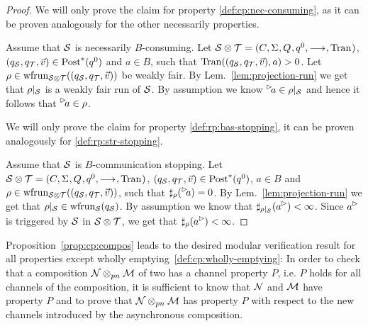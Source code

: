 \begin{proof}
    \smallskip{}
    We will only prove the claim for property \ref{def:cp:nec-consuming}, as it can be proven analogously for the other necessarily properties.

    Assume that $\S$ is necessarily $B$-consuming. Let $\S\compos\T = \aiotstup{}$, $(q_\S,q_\T,\vec{v}) \in \post^*(q^0)$ and $a \in B$, such that $\val((q_\S,q_\T,\vec{v}),a)>0$. Let \linebreak $\rho \in \frun{\S\compos\T}((q_\S,q_\T,\vec{v}))$ be weakly fair. 
 By Lem.~\ref{lem:projection-run} we get that $\rho|_\S$ is a weakly fair run of $\S$. By assumption we know $\inact{a} \in \rho|_\S$ and hence it follows that $\inact{a} \in \rho$.

    \smallskip{}
    We will only prove the claim for property \ref{def:rp:bas-stopping}, it can be proven analogously for \ref{def:rp:str-stopping}.

   Assume that $\S$ is $B$-communication stopping. Let $\S\compos\T = \aiotstup{}$, $(q_\S,q_\T,\vec{v}) \in \post^*(q^0)$, $a \in B$ and $\rho \in \frun{\S\compos\T}((q_\S,q_\T,\vec{v}))$, such that $\sharp_\rho(\inact{a}) = 0$. 
 By Lem.~\ref{lem:projection-run} we get that $\rho|_\S \in \frun{\S}(q_\S)$. By assumption we know that $\sharp_{\rho|_\S}(\outact{a}) < \infty$. Since $\outact{a}$ is triggered by $\S$ in $\S\compos\T$, we get that $\sharp_\rho(\outact{a}) < \infty$.
\end{proof}
%

Proposition~\ref{prop:cp:compos} leads to the desired modular verification result for all properties except
wholly emptying~\ref{def:cp:wholly-emptying}:
In order to check that a composition $\pnN \compospn \M$ of two \AIOPNs has a channel property $P$, i.e. $P$ holds for all channels of the composition,
it is sufficient to know that $\pnN$ and $\M$ have property $P$ and to prove that
$\pnN \compospn \M$ has property $P$ with respect to the new channels introduced by the asynchronous composition.

